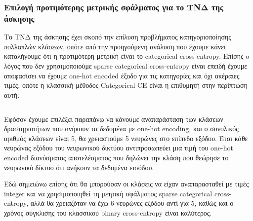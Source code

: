 \documentclass[12pt,a4paper]{article}
\begin{document}
\subsubsection{Επιλογή προτιμότερης μετρικής σφάλματος για το ΤΝΔ της άσκησης}

Το ΤΝΔ της άσκησης έχει σκοπό την επίλυση προβλήματος κατηγοριοποίησης πολλαπλών κλάσεων, οπότε από την προηγούμενη ανάλυση που έχουμε κάνει καταλήγουμε ότι η προτιμότερη μετρική είναι το categorical cross-entropy. Επίσης o λόγος που δεν χρησιμοποιούμε sparse categorical cross-entropy είναι επειδή έχουμε αποφασίσει να έχουμε one-hot encoded έξοδο για τις κατηγορίες και όχι ακέραιες τιμές, οπότε η κλασσική μέθοδος Categorical CE είναι η επιθυμητή στην περίπτωση αυτή. 

\subsection{}

Εφόσον έχουμε επιλέξει παραπάνω να κάνουμε αναπαράσταση των κλάσεων δραστηριοτήτων που ανήκουν τα δεδομένα με one-hot encoding, και ο συνολικός αριθμός κλάσεων είναι 5, θα χρειαστούμε 5 νευρώνες στο επίπεδο εξόδου. Έτσι κάθε νευρώνας εξόδου του νευρωνικού δικτύου αντιπροσωπεύει μια τιμή του one-hot encoded διανύσματος αποτελέσματος που δηλώνει την κλάση που θεώρησε το νευρωνικό δίκτυο ότι ανήκουν τα δεδομένα εισόδου.

Εδώ σημειώνω επίσης ότι θα μπορούσαν οι κλάσεις να είχαν αναπαρασταθεί με τιμές integer και να χρησιμοποιηθεί τη μετρική σφάλματος sparse categorical cross-entropy, αλλά θα χρειαζόταν να έχω 6 νευρώνες εξόδου αντί για 5, καθώς και ο χρόνος σύγκλισης του κλασσικού binary cross-entropy είναι καλύτερος.
\end{document}
